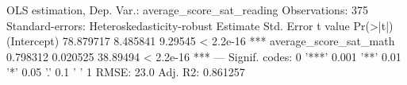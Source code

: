 \begin{codeblock}
OLS estimation, Dep. Var.: average_score_sat_reading
Observations: 375
Standard-errors: Heteroskedasticity-robust 
                        Estimate Std. Error  t value  Pr(>|t|)    
(Intercept)            78.879717   8.485841  9.29545 < 2.2e-16 ***
average_score_sat_math  0.798312   0.020525 38.89494 < 2.2e-16 ***
---
Signif. codes:  0 '***' 0.001 '**' 0.01 '*' 0.05 '.' 0.1 ' ' 1
RMSE: 23.0   Adj. R2: 0.861257
\end{codeblock}